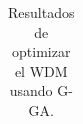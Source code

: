 \begin{landscape}
\begin{table}[ht]
\begin{tabular}{|c|c|c|c|}
    \hline
    \end{tabular}
    \hspace*{-5cm}
    \caption{Resultados de optimizar el WDM usando G-GA.}
    \label{tab:opt-GA-wdm}
\end{table}
\end{landscape}

